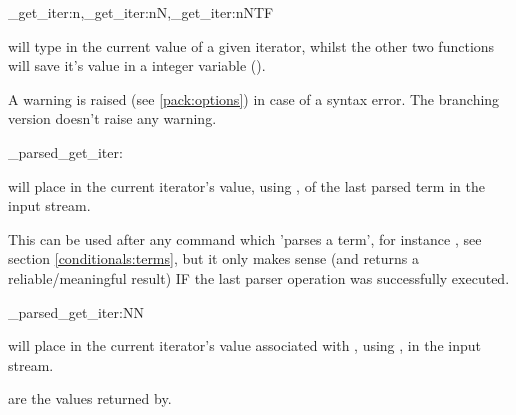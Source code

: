 \documentclass[10pt]{article}
\begin{document}
\begin{codedescribe}{\starray_get_iter:n,\starray_get_iter:nN,\starray_get_iter:nNTF}
\begin{codesyntax}%
\end{codesyntax}
 will type in the current value of a given iterator, whilst the other two functions will save it's value in a integer variable ().
\end{codedescribe}
\begin{tsremark}
A warning is raised (see \ref{pack:options}) in case of a  syntax error. The branching version doesn't raise any warning.
\end{tsremark}

\begin{codedescribe}[code,EXP,new=2023/05/20]{\starray_parsed_get_iter:}
\begin{codesyntax}%
\end{codesyntax}
 will place in the current iterator's value,  using , of the last parsed term in the input stream.
\end{codedescribe}
\begin{tsremark}
This can be used after any command which 'parses a term', for instance , see section \ref{conditionals:terms}, but it only makes sense (and returns a reliable/meaningful result) IF the last parser operation was successfully executed.
\end{tsremark}

\begin{codedescribe}[code,EXP,new=2023/11/28]{\starray_parsed_get_iter:NN}
\begin{codesyntax}%
\end{codesyntax}
 will place in the current iterator's value associated with ,  using , in the input stream.
\end{codedescribe}
\begin{tsremark}
 are the values returned by\break  {}.
\end{tsremark}
\end{document}
